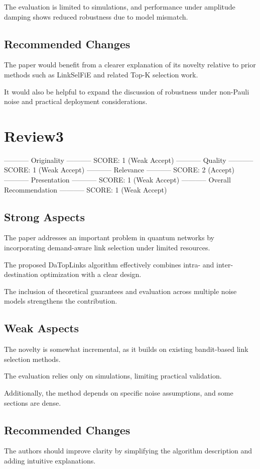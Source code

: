 \documentclass[conference]{IEEEtran}
\begin{document}
The evaluation is limited to simulations, and performance under
amplitude damping shows reduced robustness due to model mismatch.


\subsection{Recommended Changes}
\label{sec:orgb3cc78e}
The paper would benefit from a clearer explanation of its novelty
relative to prior methods such as LinkSelFiE and related Top-K
selection work.


It would also be helpful to expand the discussion of robustness under
non-Pauli noise and practical deployment considerations.


\section{Review3}
\label{sec:org14d139b}
----------- Originality -----------
SCORE: 1 (Weak Accept)
----------- Quality -----------
SCORE: 1 (Weak Accept)
----------- Relevance -----------
SCORE: 2 (Accept)
----------- Presentation -----------
SCORE: 1 (Weak Accept)
----------- Overall Recommendation -----------
SCORE: 1 (Weak Accept)

\subsection{Strong Aspects}
\label{sec:orgd2deab5}
The paper addresses an important problem in quantum networks by
incorporating demand-aware link selection under limited resources.

The proposed DaTopLinks algorithm effectively combines intra- and
inter-destination optimization with a clear design.

The inclusion of theoretical guarantees and evaluation across multiple
noise models strengthens the contribution.


\subsection{Weak Aspects}
\label{sec:orgdde434c}
The novelty is somewhat incremental, as it builds on existing
bandit-based link selection methods.

The evaluation relies only on simulations, limiting practical
validation.

Additionally, the method depends on specific noise assumptions, and
some sections are dense.

\subsection{Recommended Changes}
\label{sec:orgf69b65e}
The authors should improve clarity by simplifying the algorithm
description and adding intuitive explanations.
\end{document}
